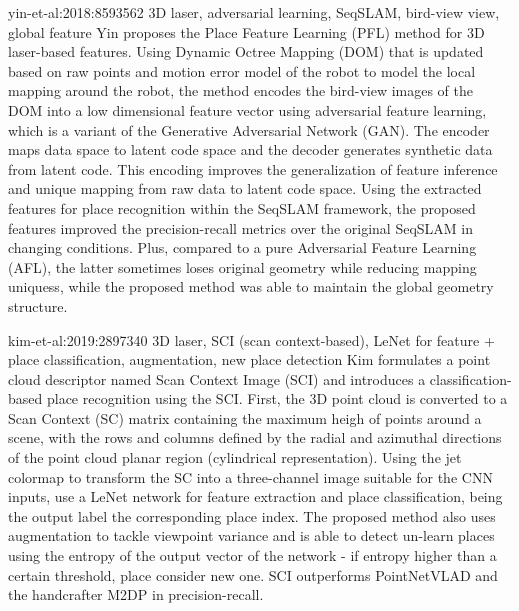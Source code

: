 
yin-et-al:2018:8593562 3D laser, adversarial learning, SeqSLAM, bird-view view, global feature
Yin proposes the Place Feature Learning (PFL) method for 3D laser-based features. Using Dynamic Octree Mapping (DOM) that is updated based on raw points and motion error model of the robot to model the local mapping around the robot, the method encodes the bird-view images of the DOM into a low dimensional feature vector using adversarial feature learning, which is a variant of the Generative Adversarial Network (GAN). The encoder maps data space to latent code space and the decoder generates synthetic data from latent code. This encoding improves the generalization of feature inference and unique mapping from raw data to latent code space. Using the extracted features for place recognition within the SeqSLAM framework, the proposed features improved the precision-recall metrics over the original SeqSLAM in changing conditions. Plus, compared to a pure Adversarial Feature Learning (AFL), the latter sometimes loses original geometry while reducing mapping uniquess, while the proposed method was able to maintain the global geometry structure.

kim-et-al:2019:2897340 3D laser, SCI (scan context-based), LeNet for feature + place classification, augmentation, new place detection
Kim formulates a point cloud descriptor named Scan Context Image (SCI) and introduces a classification-based place recognition using the SCI. First, the 3D point cloud is converted to a Scan Context (SC) matrix containing the maximum heigh of points around a scene, with the rows and columns defined by the radial and azimuthal directions of the point cloud planar region (cylindrical representation). Using the jet colormap to transform the SC into a three-channel image suitable for the CNN inputs, use a LeNet network for feature extraction and place classification, being the output label the corresponding place index. The proposed method also uses augmentation to tackle viewpoint variance and is able to detect un-learn places using the entropy of the output vector of the network - if entropy higher than a certain threshold, place consider new one. SCI outperforms PointNetVLAD and the handcrafter M2DP in precision-recall.

